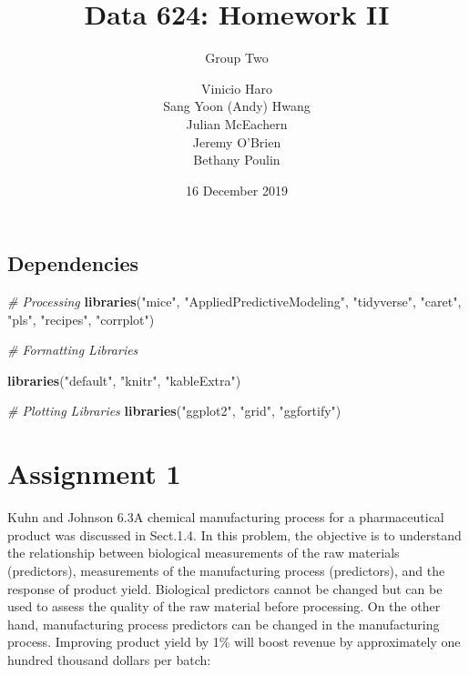 \documentclass[]{report}
\title{Data 624: Homework II}
\subtitle{Group Two}
\author{Vinicio Haro \\ Sang Yoon (Andy) Hwang \\ Julian McEachern \\ Jeremy O'Brien \\ Bethany Poulin}
\date{16 December 2019}
\newenvironment{Shaded}{\begin{snugshade}}{\end{snugshade}}
\newcommand{\CommentTok}[1]{\textcolor[rgb]{0.56,0.35,0.01}{\textit{#1}}}
\newcommand{\KeywordTok}[1]{\textcolor[rgb]{0.13,0.29,0.53}{\textbf{#1}}}
\newcommand{\NormalTok}[1]{#1}
\newcommand{\StringTok}[1]{\textcolor[rgb]{0.31,0.60,0.02}{#1}}
\begin{document}
\maketitle

{
\setcounter{tocdepth}{2}
\tableofcontents
}
\hypertarget{dependencies}{%
\section{Dependencies}\label{dependencies}}

\begin{Shaded}
\begin{Highlighting}[]
\CommentTok{# Processing}
\KeywordTok{libraries}\NormalTok{(}\StringTok{"mice"}\NormalTok{, }\StringTok{"AppliedPredictiveModeling"}\NormalTok{, }\StringTok{"tidyverse"}\NormalTok{, }
    \StringTok{"caret"}\NormalTok{, }\StringTok{"pls"}\NormalTok{, }\StringTok{"recipes"}\NormalTok{, }\StringTok{"corrplot"}\NormalTok{)}

\CommentTok{# Formatting Libraries}

\KeywordTok{libraries}\NormalTok{(}\StringTok{"default"}\NormalTok{, }\StringTok{"knitr"}\NormalTok{, }\StringTok{"kableExtra"}\NormalTok{)}

\CommentTok{# Plotting Libraries}
\KeywordTok{libraries}\NormalTok{(}\StringTok{"ggplot2"}\NormalTok{, }\StringTok{"grid"}\NormalTok{, }\StringTok{"ggfortify"}\NormalTok{)}
\end{Highlighting}
\end{Shaded}

\hypertarget{AS-1}{%
\chapter*{Assignment 1}\label{AS-1}}


\begin{question}{Kuhn and Johnson 6.3}A chemical manufacturing process for a pharmaceutical product was discussed in Sect.1.4. In this problem, the objective is to understand the relationship between biological measurements of the raw materials (predictors), measurements of the manufacturing process (predictors), and the response of product yield. Biological predictors cannot be changed but can be used to assess the quality of the raw material before processing. On the other hand, manufacturing process predictors can be changed in the manufacturing process. Improving product yield by 1\% will boost revenue by approximately one hundred thousand dollars per batch:\end{question}
\end{document}
